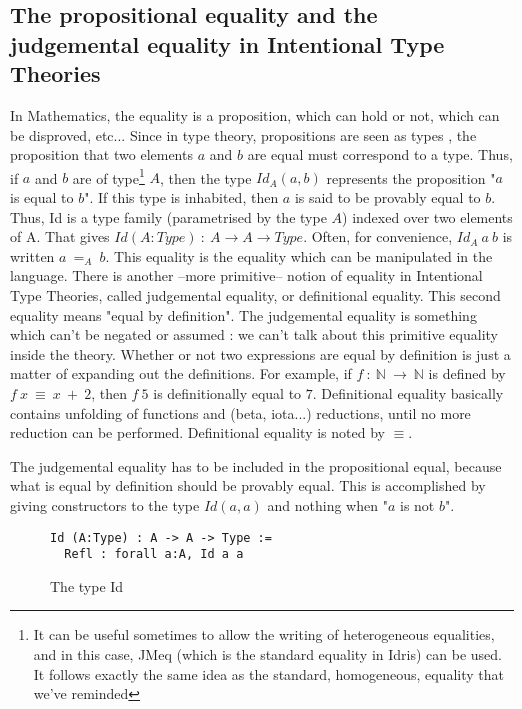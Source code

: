 \subsection{The propositional equality and the judgemental equality in Intentional Type Theories}
In Mathematics, the equality is a proposition, which can hold or not, which can be disproved, etc...
Since in type theory, propositions are seen as types \cite{How80}, the proposition that two elements $a$ and $b$ are equal must correspond to a type. Thus, if $a$ and $b$ are of type\footnote{It can be useful sometimes to allow the writing of heterogeneous equalities, and in this case, JMeq (which is the standard equality in Idris) can be used. It follows exactly the same idea as the standard, homogeneous, equality that we've reminded} $A$, then the type $Id_A(a, b)$ represents the proposition "$a$ is equal to $b$". If this type is inhabited, then $a$ is said to be provably equal to $b$.
Thus, Id is a type family (parametrised by the type $A$) indexed over two elements of A. That gives $Id (A:Type)\ :\ A \rightarrow A \rightarrow Type$. Often, for convenience, $Id_A\ a\ b$ is written $a\ =_A\ b$.
This equality is the equality which can be manipulated in the language. There is another --more primitive-- notion of equality in Intentional Type Theories, called judgemental equality, or definitional equality. This second equality means "equal by definition". The judgemental equality is something which can't be negated or assumed : we can't talk about this primitive equality inside the theory. Whether or not two expressions are equal by definition is just a matter of expanding out the definitions. For example, if $f\ :\ \mathbb{N}\ \rightarrow\ \mathbb{N}$ is defined by $f\ x\ \equiv\ x\ +\ 2$, then $f\ 5$ is definitionally equal to $7$. Definitional equality basically contains unfolding of functions and (beta, iota...) reductions, until no more reduction can be performed.
Definitional equality is noted by $\equiv$.

The judgemental equality has to be included in the propositional equal, because what is equal by definition should be provably equal.
This is accomplished by giving constructors to the type $Id(a,a)$ and nothing when "$a$ is not $b$".
\begin{figure}[H]
\figrule
\begin{center}
\begin{lstlisting}
Id (A:Type) : A -> A -> Type :=
  Refl : forall a:A, Id a a
\end{lstlisting}
\end{center}
\caption{The type Id}
\figrule
\end{figure}

